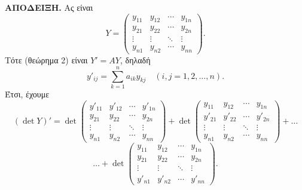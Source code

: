 \documentclass[11pt,a4paper,twoside]{book}
\begin{document}
\textbf{ΑΠΟΔΕΙΞΗ.} Ας είναι
\[
Y = \begin{pmatrix}
y_{11} & y_{12} & \cdots & y_{1n} \\
y_{21} & y_{22} & \cdots & y_{2n} \\
\vdots & \vdots & \ddots & \vdots \\
y_{n1} & y_{n2} & \cdots & y_{nn}
\end{pmatrix}.
\]
Τότε (θεώρημα 2) είναι $Y' = AY$, δηλαδή
\[
y'_{ij} = \sum_{k=1}^{n} a_{ik} y_{kj} \quad (i,j=1,2,\dots,n).
\]
Έτσι, έχουμε
\[
(\det Y)' = \det
\begin{pmatrix}
y'_{11} & y'_{12} & \cdots & y'_{1n} \\
y_{21} & y_{22} & \cdots & y_{2n} \\
\vdots & \vdots & \ddots & \vdots \\
y_{n1} & y_{n2} & \cdots & y_{nn}
\end{pmatrix}
+ \det
\begin{pmatrix}
y_{11} & y_{12} & \cdots & y_{1n} \\
y'_{21} & y'_{22} & \cdots & y'_{2n} \\
\vdots & \vdots & \ddots & \vdots \\
y_{n1} & y_{n2} & \cdots & y_{nn}
\end{pmatrix}
+ \dots
\]
\[
\dots + \det
\begin{pmatrix}
y_{11} & y_{12} & \cdots & y_{1n} \\
y_{21} & y_{22} & \cdots & y_{2n} \\
\vdots & \vdots & \ddots & \vdots \\
y'_{n1} & y'_{n2} & \cdots & y'_{nn}
\end{pmatrix}.
\]
\end{document}
